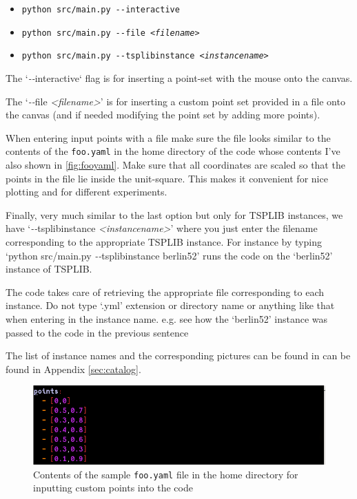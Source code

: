 \begin{appendices}
{\LARGE \color{alizarin}
\begin{itemize}
\item \texttt{python src/main.py \textit{-}\textit{-}interactive}
\item \texttt{python src/main.py \textit{-}\textit{-}file \textit{<filename>}} 
\item \texttt{python src/main.py \textit{-}\textit{-}tsplibinstance \textit{<instancename>}}
\end{itemize}
}

The `\textit{-}\textit{-}interactive` flag is for inserting a 
point-set with the mouse onto the canvas. 

The `\textit{-}\textit{-}file \textit{<filename>}' is for inserting a 
custom point set provided in a file onto the canvas  (and if needed 
modifying the point set by adding more points). 

When entering input points with a file make sure the file looks similar 
to the contents of the \verb|foo.yaml| in the home directory of the code 
whose contents I've also shown in \autoref{fig:fooyaml}. Make sure that 
all coordinates are scaled so that the points in the file lie inside the unit-square. This makes it convenient 
for nice plotting and for different experiments. 

Finally, very much similar to the last option but only for TSPLIB instances, we have
`\textit{-}\textit{-}tsplibinstance \textit{<instancename>}' where you just enter the filename
corresponding to the appropriate TSPLIB instance. For instance by typing
`python src/main.py \textit{-}\textit{-}tsplibinstance berlin52' runs the code 
on the `berlin52' instance of TSPLIB. 

\begin{mdframed}
{\color{alizarin} 
The code takes care of retrieving the appropriate file corresponding to each instance. Do not 
type `.yml' extension or directory name or anything like that when entering in the instance name. e.g. see how the `berlin52'
instance was passed to the code in the previous sentence}
\end{mdframed}

The list of instance names and the corresponding pictures can be found in can be found in Appendix \autoref{sec:catalog}. 

\begin{figure}[H]
  \centering
  \includegraphics[width=12cm]{miscimages/fooyaml-screenshot.png}
  \caption{\label{fig:fooyaml} Contents of the sample \texttt{foo.yaml} file in the home directory for inputting custom points into the code}
\end{figure}





\end{appendices}
